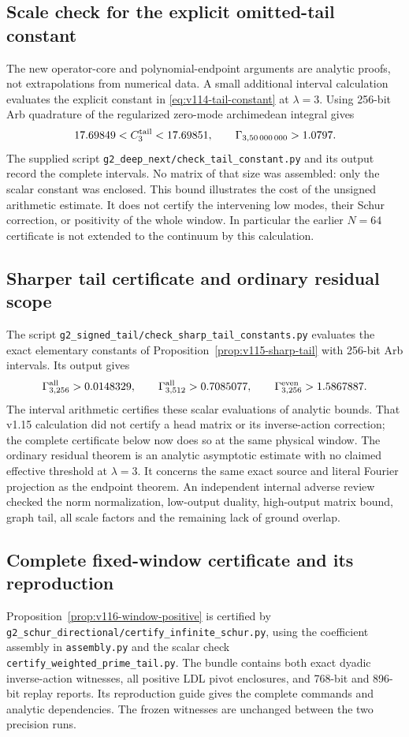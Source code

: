\documentclass[11pt]{article}
\theoremstyle{remark}
\begin{document}
\subsection*{Scale check for the explicit omitted-tail constant}
The new operator-core and polynomial-endpoint arguments are analytic
proofs, not extrapolations from numerical data. A small additional
interval calculation evaluates the explicit constant in
\eqref{eq:v114-tail-constant} at $\lambda=3$. Using 256-bit Arb
quadrature of the regularized zero-mode archimedean integral gives
\[
 17.69849<C_3^{\rm tail}<17.69851,\qquad
 \Gamma_{3,50\,000\,000}>1.0797.
\]
The supplied script \texttt{g2\_deep\_next/check\_tail\_constant.py}
and its output record the complete intervals. No matrix of that size
was assembled: only the scalar constant was enclosed. This bound
illustrates the cost of the unsigned arithmetic estimate. It does not
certify the intervening low modes, their Schur correction, or positivity
of the whole window. In particular the earlier $N=64$ certificate is
not extended to the continuum by this calculation.

\subsection*{Sharper tail certificate and ordinary residual scope}
The script \texttt{g2\_signed\_tail/check\_sharp\_tail\_constants.py}
evaluates the exact elementary constants of
Proposition~\ref{prop:v115-sharp-tail} with 256-bit Arb intervals.
Its output gives
\[
 \Gamma^{\rm all}_{3,256}>0.0148329,\qquad
 \Gamma^{\rm all}_{3,512}>0.7085077,\qquad
 \Gamma^{\rm even}_{3,256}>1.5867887.
\]
The interval arithmetic certifies these scalar evaluations of analytic
bounds. That v1.15 calculation did not certify a head matrix or its
inverse-action correction; the complete certificate below now does so
at the same physical window. The ordinary residual theorem is an analytic
asymptotic estimate with no claimed effective threshold at $\lambda=3$.
It concerns the same exact source and literal Fourier projection as
the endpoint theorem. An independent internal adverse review checked
the norm normalization, low-output duality, high-output matrix bound,
graph tail, all scale factors and the remaining lack of ground overlap.

\subsection*{Complete fixed-window certificate and its reproduction}
Proposition~\ref{prop:v116-window-positive} is certified by
\texttt{g2\_schur\_directional/certify\_infinite\_schur.py}, using
the coefficient assembly in \texttt{assembly.py} and the scalar check
\texttt{certify\_weighted\_prime\_tail.py}. The bundle contains both
exact dyadic inverse-action witnesses, all positive LDL pivot enclosures,
and 768-bit and 896-bit replay reports. Its reproduction guide gives
the complete commands and analytic dependencies. The frozen witnesses
are unchanged between the two precision runs.
\end{document}
